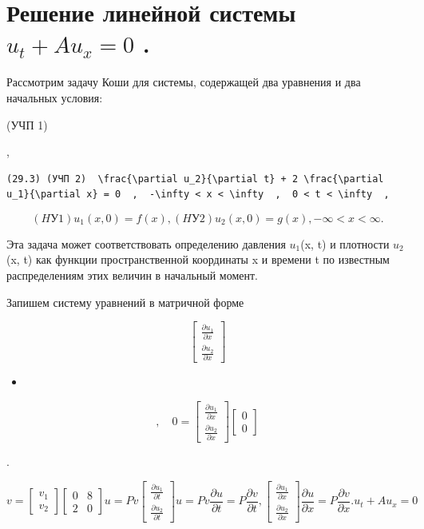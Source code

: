 \documentclass[
  ukrainian,
]{article}
\providecommand{\tightlist}{%
  \setlength{\itemsep}{0pt}\setlength{\parskip}{0pt}}
\begin{document}
\section{\texorpdfstring{Решение линейной системы \(u_t + Au_x = 0\)
.}{Решение линейной системы u\_t + Au\_x = 0 .}}\label{ux440ux435ux448ux435ux43dux438ux435-ux43bux438ux43dux435ux439ux43dux43eux439-ux441ux438ux441ux442ux435ux43cux44b-u_t-au_x-0-.}

Рассмотрим задачу Коши для системы, содержащей два уравнения и два
начальных условия:

(УЧП 1)

,

\begin{verbatim}
(29.3) (УЧП 2)  \frac{\partial u_2}{\partial t} + 2 \frac{\partial u_1}{\partial x} = 0  ,  -\infty < x < \infty  ,  0 < t < \infty  ,
\end{verbatim}

\[
(HУ 1)  u_1(x, 0) = f(x)  ,
(HУ 2)  u_2(x, 0) = g(x)  ,  -\infty < x < \infty  .
\]

Эта задача может соответствовать определению давления \(u_1\)(x, t) и
плотности \(u_2\)(x, t) как функции пространственной координаты x и
времени t по известным распределениям этих величин в начальный момент.

Запишем систему уравнений в матричной форме

\[
\begin{bmatrix} \frac{\partial u_1}{\partial x} \\ \frac{\partial u_2}{\partial x} \end{bmatrix}
\]

\begin{itemize}
\tightlist
\item
\end{itemize}

\[
, \quad 0 =
\begin{bmatrix} \frac{\partial u_1}{\partial x} \\ \frac{\partial u_2}{\partial x} \end{bmatrix}
\begin{bmatrix} 0 \\ 0 \end{bmatrix}
\]

.

\[
v =
\begin{bmatrix} v_1 \\ v_2 \end{bmatrix}
\begin{bmatrix} 0 & 8 \\ 2 & 0 \end{bmatrix}
u = Pv
\begin{bmatrix} \frac{\partial u_1}{\partial t} \\ \frac{\partial u_2}{\partial t} \end{bmatrix}
u = Pv
\frac{\partial u}{\partial t} = P \frac{\partial v}{\partial t},
\begin{bmatrix} \frac{\partial u_1}{\partial x} \\ \frac{\partial u_2}{\partial x} \end{bmatrix}
\frac{\partial u}{\partial x} = P \frac{\partial v}{\partial x}.
u_t + Au_x = 0
\]
\end{document}
